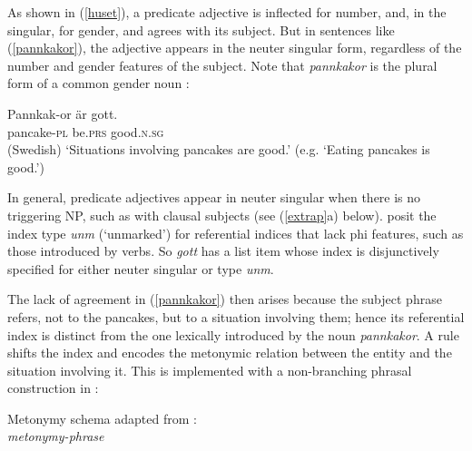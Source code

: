 \documentclass[output=paper
 	        ,biblatex
                ,babelshorthands
                ,newtxmath
                ,draftmode
                ,colorlinks, citecolor=brown
]{langscibook}
\begin{document}
\noindent
As shown in (\ref{huset}), a predicate adjective is inflected for number, and, in the singular, for gender, and agrees with its subject. But in sentences like (\ref{pannkakor}), the adjective appears in the neuter singular form, regardless of the number and gender features of the subject.  Note that \textit{pannkakor} is the plural form of a common gender noun \citep{Faarlund:1977, Enger:2004,Josefsson:2009}:

\begin{exe} 
\ex \label{pannkakor}\label{ex-pannkakor-aer-gott}
\gll   Pannkak-or 	är	gott. \\
	pancake-\textsc{pl}	be.\textsc{prs}	good.\textsc{n.sg} \\\hfill(Swedish)
\glt	`Situations involving pancakes are good.’ (e.g. `Eating pancakes is good.’)
\end{exe}

\noindent
In general,  predicate adjectives appear in neuter singular when there is no triggering NP, such as with clausal subjects (see (\ref{extrap}a) below).  \citet[154]{Wechsler+Zlatic:2003} posit the index type \textit{unm} (`unmarked') for  referential indices that lack phi features, such as those introduced by verbs.   So \textit{gott} has a \subj list item whose index  is disjunctively specified for either neuter singular or type \textit{unm}.  

The lack of agreement in (\ref{pannkakor}) then arises because the subject phrase refers, not to the pancakes, but to a situation involving them; hence its referential index is distinct from the one lexically introduced by the noun \textit{pannkakor}.  A rule shifts the index and encodes the metonymic relation between the entity and the situation involving it.  This  is implemented with a non-branching phrasal construction in \citet[82]{Wechsler:2013}:

\ea	
\label{metonymy}
Metonymy schema adapted from \citet[82]{Wechsler:2013}:\\
\textit{metonymy-phrase} \impl \\
\z
\end{document}
